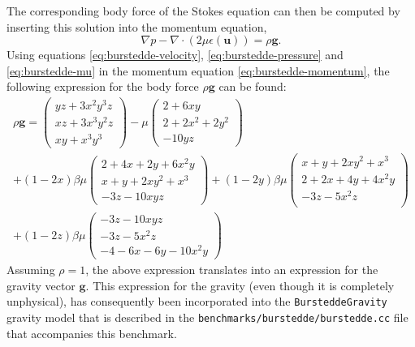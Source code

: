 \documentclass{article}
\begin{document}
The corresponding body force of the Stokes equation can then be computed by inserting this solution into the momentum equation,
\begin{equation}
  {\nabla} p - \nabla \cdot (2  \mu {\epsilon(\mathbf u)}) = \rho \mathbf g.
  \label{eq:burstedde-momentum}
\end{equation}
Using equations \eqref{eq:burstedde-velocity}, \eqref{eq:burstedde-pressure}
and \eqref{eq:burstedde-mu} in the
momentum equation \eqref{eq:burstedde-momentum}, the following expression for the body force
$\rho\mathbf g$ can be found:
\begin{multline}
  {\rho\mathbf g}
  =
  \left(
    \begin{array}{c}
      yz+3x^2y^3z\\
      xz +3x^3y^2z \\
      xy+x^3y^3
    \end{array}
  \right)
  -\mu
  \left(
    \begin{array}{c}
      2+6xy  \\
      2 + 2x^2 +  2y^2 \\
      -10yz
    \end{array}
  \right) \\
  +
  (1-2x)\beta \mu
  \left(
    \begin{array}{c}
      2+4x+2y+6x^2y \\
      x+y+2xy^2+x^3 \\
      -3z -10xyz
    \end{array}
  \right)
  +(1-2y)\beta \mu
  \left(
    \begin{array}{c}
      x+y+2xy^2+x^3 \\
      2+2x+4y+4x^2y \\
      -3z-5x^2z \\
    \end{array}
  \right)
  \\
  +(1-2z)\beta \mu
  \left(
    \begin{array}{c}
      -3z -10xyz \\
      -3z-5x^2z \\
      -4-6x-6y-10x^2y
    \end{array}
  \right)
\end{multline}
Assuming $\rho = 1$, the above expression translates into an expression for the
gravity vector $\mathbf g$. This expression for the gravity (even though it is
completely unphysical), has consequently been incorporated into the
\texttt{BursteddeGravity} gravity model that is described in the
\texttt{benchmarks/burstedde/burstedde.cc} file that accompanies this benchmark.
\end{document}
